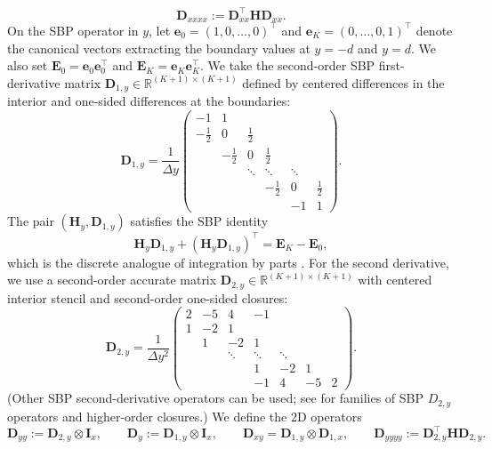 \documentclass[12pt]{article}
\numberwithin{equation}{section}
\begin{document}
\[
\boldsymbol D_{xxxx} := \boldsymbol D_{xx}^\top \boldsymbol H \boldsymbol D_{xx}.
\]
On the SBP operator in $y$, let $\boldsymbol e_0=(1,0,\dots,0)^\top$ and $\boldsymbol e_K=(0,\dots,0,1)^\top$ denote the canonical vectors extracting the boundary values at $y=-d$ and $y=d$. We also set $\boldsymbol E_0=\boldsymbol e_0\boldsymbol e_0^\top$ and
$\boldsymbol E_K=\boldsymbol e_K\boldsymbol e_K^\top$. We take the second-order SBP first-derivative matrix
$\boldsymbol D_{1,y}\in\mathbb{R}^{(K+1)\times(K+1)}$ defined by centered
differences in the interior and one-sided differences at the boundaries:
\[
\boldsymbol D_{1,y}
=
\frac{1}{\Delta y}
\begin{pmatrix}
-1 &  1 &        &        &        &  \\
-\tfrac12 & 0 & \tfrac12 &        &        &  \\
        & -\tfrac12 & 0 & \tfrac12 &        &  \\
        &        & \ddots & \ddots & \ddots &  \\
        &        &        & -\tfrac12 & 0 & \tfrac12 \\
        &        &        &        & -1 & 1
\end{pmatrix}.
\]
The pair $(\boldsymbol H_y,\boldsymbol D_{1,y})$ satisfies the SBP identity
\[
\boldsymbol H_y\boldsymbol D_{1,y}
+
(\boldsymbol H_y\boldsymbol D_{1,y})^\top
=
\boldsymbol E_K-\boldsymbol E_0,
\]
which is the discrete analogue of integration by parts
\cite{Fernandez2014review,Carpenter1999}. For the second derivative, we use a second-order accurate matrix $\boldsymbol D_{2,y}\in\mathbb{R}^{(K+1)\times(K+1)}$ with centered interior
stencil and second-order one-sided closures:
\[
\boldsymbol D_{2,y}
=
\frac{1}{\Delta y^2}
\begin{pmatrix}
 2 & -5 &  4 & -1 &        &        \\
 1 & -2 &  1 &    &        &        \\
   &  1 & -2 &  1 &        &        \\
   &    & \ddots & \ddots & \ddots &  \\
   &    &        &  1 & -2 &  1 \\
   &    &        & -1 &  4 & -5 & 2
\end{pmatrix}.
\]
(Other SBP second-derivative operators can be used; see \cite{Mattsson2004} for
families of SBP $D_{2,y}$ operators and higher-order closures.) We define the 2D operators
\[
\boldsymbol D_{yy} := \boldsymbol D_{2,y}\otimes \boldsymbol I_x,
\qquad
\boldsymbol D_{y} := \boldsymbol D_{1,y}\otimes \boldsymbol I_x,
\qquad \boldsymbol{D}_{xy}=\boldsymbol{D}_{1,y}\otimes \boldsymbol{D}_{1,x},
\qquad \boldsymbol{D}_{yyyy} := \boldsymbol{D}_{2,y}^\top \boldsymbol H \boldsymbol D_{2,y}.
\]
\end{document}
